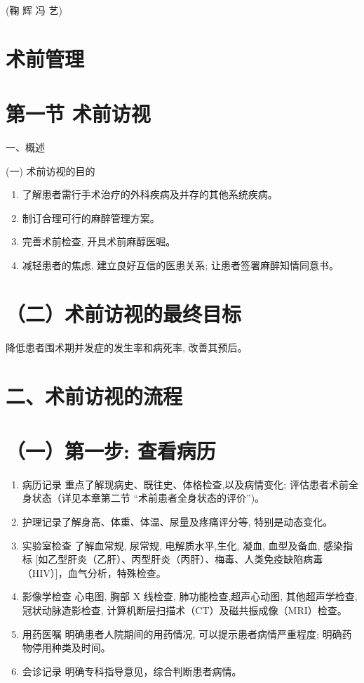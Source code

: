 \documentclass[10pt]{article}
\begin{document}
(鞠 辉 冯 艺)

\section*{术前管理}
\section*{第一节 术前访视}
一、概述

(一) 术前访视的目的

\begin{enumerate}
  \item 了解患者需行手术治疗的外科疾病及并存的其他系统疾病。

  \item 制订合理可行的麻醉管理方案。

  \item 完善术前检查, 开具术前麻醇医啒。

  \item 减轻患者的焦虑, 建立良好互信的医患关系; 让患者签署麻醉知情同意书。

\end{enumerate}

\section*{（二）术前访视的最终目标}
降低患者围术期并发症的发生率和病死率, 改善其预后。

\section*{二、术前访视的流程}
\section*{（一）第一步: 查看病历}
\begin{enumerate}
  \item 病历记录 重点了解现病史、既往史、体格检查,以及病情变化; 评估患者术前全身状态（详见本章第二节 “术前患者全身状态的评价”)。

  \item 护理记录了解身高、体重、体温、尿量及疼痛评分等, 特别是动态变化。

  \item 实验室检查 了解血常规, 尿常规, 电解质水平,生化, 凝血, 血型及备血, 感染指标 [如乙型肝炎（乙肝）、丙型肝炎（丙肝）、梅毒、人类免疫缺陷病毒（HIV）]，血气分析，特殊检查。

  \item 影像学检查 心电图, 胸部 X 线检查, 肺功能检查,超声心动图, 其他超声学检查, 冠状动脉造影检查, 计算机断层扫描术（CT）及磁共振成像（MRI）检查。

  \item 用药医嘱 明确患者人院期间的用药情况, 可以提示患者病情严重程度; 明确药物停用种类及时间。

  \item 会诊记录 明确专科指导意见，综合判断患者病情。

\end{enumerate}
\end{document}
